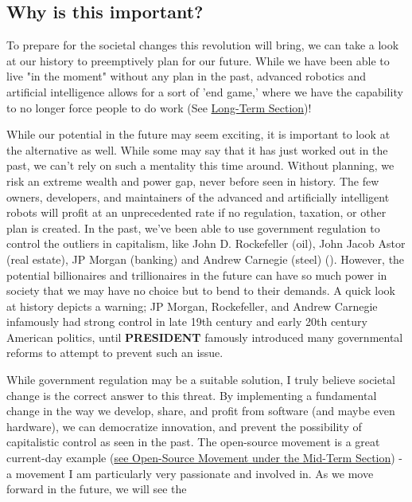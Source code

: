 \subsection{Why is this important?}

To prepare for the societal changes this revolution will bring, we can take a look at our history to preemptively plan for our future. While we have been able to live "in the moment" without any plan in the past, advanced robotics and artificial intelligence allows for a sort of 'end game,' where we have the capability to no longer force people to do work (See \hyperlink{sec:long}{Long-Term Section})!

While our potential in the future may seem exciting, it is important to look at the alternative as well. While some may say that it has just worked out in the past, we can't rely on such a mentality this time around. Without planning, we risk an extreme wealth and power gap, never before seen in history. The few owners, developers, and maintainers of the advanced and artificially intelligent robots will profit at an unprecedented rate if no regulation, taxation, or other plan is created. In the past, we've been able to use government regulation to control the outliers in capitalism, like John D. Rockefeller (oil), John Jacob Astor (real estate), JP Morgan (banking) and Andrew Carnegie (steel) (\cite{CapitalistAmerica}). However, the potential billionaires and trillionaires in the future can have so much power in society that we may have no choice but to bend to their demands. A quick look at history depicts a warning; JP Morgan, Rockefeller, and Andrew Carnegie infamously had strong control in late 19th century and early 20th century American politics, until \textbf{PRESIDENT} famously introduced many governmental reforms to attempt to prevent such an issue. %

While government regulation may be a suitable solution, I truly believe societal change is the correct answer to this threat. By implementing a fundamental change in the way we develop, share, and profit from software (and maybe even hardware), we can democratize innovation, and prevent the possibility of capitalistic control as seen in the past. The open-source movement is a great current-day example (\hyperref[subsec:open-source]{see Open-Source Movement under the Mid-Term Section}) - a movement I am particularly very passionate and involved in. As we move forward in the future, we will see the %


